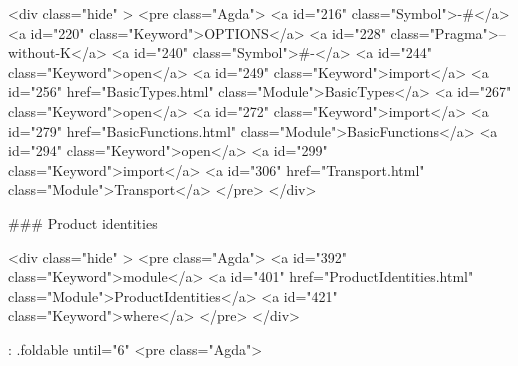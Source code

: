   <div class="hide" >
<pre class="Agda">
<a id="216" class="Symbol">{-#</a> <a id="220" class="Keyword">OPTIONS</a> <a id="228" class="Pragma">--without-K</a> <a id="240" class="Symbol">#-}</a>
<a id="244" class="Keyword">open</a> <a id="249" class="Keyword">import</a> <a id="256" href="BasicTypes.html" class="Module">BasicTypes</a>
<a id="267" class="Keyword">open</a> <a id="272" class="Keyword">import</a> <a id="279" href="BasicFunctions.html" class="Module">BasicFunctions</a>
<a id="294" class="Keyword">open</a> <a id="299" class="Keyword">import</a> <a id="306" href="Transport.html" class="Module">Transport</a>
</pre>
</div>

### Product identities

<div class="hide" >
<pre class="Agda">
<a id="392" class="Keyword">module</a>
  <a id="401" href="ProductIdentities.html" class="Module">ProductIdentities</a>
  <a id="421" class="Keyword">where</a>
</pre>
</div>


{: .foldable until="6"}
<pre class="Agda">

